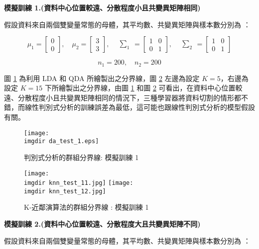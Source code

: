\textbf{\large 模擬訓練 1.(資料中心位置較遠、分散程度小且共變異矩陣相同)}

假設資料來自兩個雙變量常態的母體，其平均數、共變異矩陣與樣本數分別為 ：

\[\mu_1 = \begin{bmatrix}
0 \\
0
\end{bmatrix}, \quad \mu_2 = \begin{bmatrix}
3 \\
3
\end{bmatrix}, \quad \begin{matrix} \sum_{1} \end{matrix} = \begin{bmatrix}
1 & 0\\
0 & 1
\end{bmatrix}, \quad \begin{matrix} \sum_{2} \end{matrix} = \begin{bmatrix}
1 & 0\\
0 & 1
\end{bmatrix}\]

\[n_1 = 200, \quad n_2 = 200\]

圖 \ref{fig:da_test_1} 為利用 LDA 和 QDA 所繪製出之分界線，圖 \ref{fig:knn_test_1} 左邊為設定 $K =5$，右邊為設定 $K = 15$ 下所繪製出之分界線，由圖 \ref{fig:da_test_1} 和圖 \ref{fig:knn_test_1} 可看出，在資料中心位置較遠、分散程度小且共變異矩陣相同的情況下，三種學習器將資料切割的情形都不錯，而線性判別式分析的訓練誤差為最低，這可能也跟線性判別式分析的模型假設有關。
\begin{figure}[H]
    \centering
        \texttt{[image: \\imgdir da\_test\_1.eps]}
    \caption{判別式分析的群組分界線: 模擬訓練 1}
    \label{fig:da_test_1}
\end{figure}

\begin{figure}[H]
\centering
\texttt{[image: \\imgdir knn\_test\_11.jpg]}
\texttt{[image: \\imgdir knn\_test\_12.jpg]}
\caption{K-近鄰演算法的群組分界線 : 模擬訓練 1} 
\label{fig:knn_test_1}
\end{figure}

\textbf{\large 模擬訓練 2.(資料中心位置較遠、分散程度大且共變異矩陣不同)}

假設資料來自兩個雙變量常態的母體，其平均數、共變異矩陣與樣本數分別為 ：

